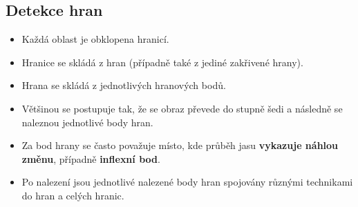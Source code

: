 \subsection{Detekce hran}
\begin{itemize}
	\item Každá oblast je obklopena hranicí.
	\item Hranice se skládá z hran (případně také z jediné zakřivené hrany).

	\item Hrana se skládá z jednotlivých hranových bodů.
	\item Většinou se postupuje tak, že se obraz převede do stupně šedi a následně se naleznou jednotlivé body hran.
	\item Za bod hrany se často považuje místo, kde průběh jasu \textbf{vykazuje náhlou změnu}, případně \textbf{inflexní bod}.
	\item Po nalezení jsou jednotlivé nalezené body hran spojovány různými technikami do hran a celých hranic.
\end{itemize}
